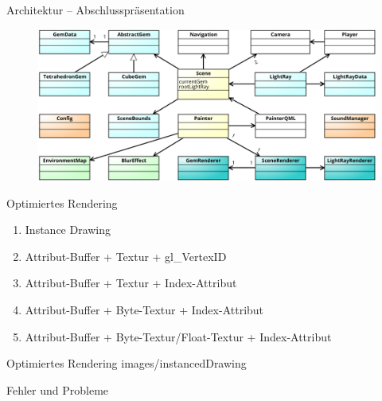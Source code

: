\begin{frame}{Architektur -- Abschlusspräsentation}
	\begin{figure}
		\centering
		\includegraphics[width=\textwidth, height=0.8\textheight, keepaspectratio]{images/klassendiagramm-final}
	\end{figure}
\end{frame}

\begin{frame}{Optimiertes Rendering}
	\begin{enumerate}
		\item Instance Drawing
		\vfill
		\item Attribut-Buffer + Textur + gl\_VertexID
		\vfill
		\item Attribut-Buffer + Textur + Index-Attribut
		\vfill
		\item Attribut-Buffer + Byte-Textur + Index-Attribut
		\vfill
		\item Attribut-Buffer + Byte-Textur/Float-Textur + Index-Attribut
	\end{enumerate}
\end{frame}

\slidegraphic
{Optimiertes Rendering}
{images/instancedDrawing}
{}

\begin{frame}{Fehler und Probleme}
	\centering
\end{frame}

